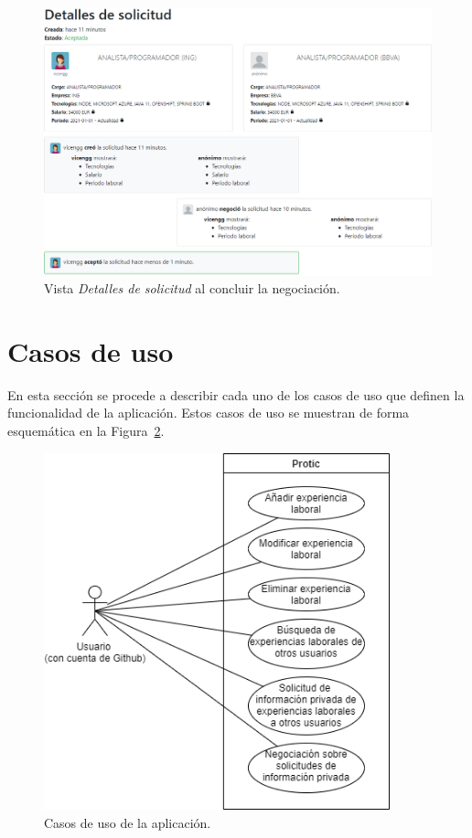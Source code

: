 \documentclass[a4paper, 12pt]{book}
\begin{document}
    \begin{figure}
        \centering
        \includegraphics[width=15cm, keepaspectratio]{img/negotiation_details.PNG}
        \caption{Vista \emph{Detalles de solicitud} al concluir la negociación.}\label{fig:negotiation_details}
    \end{figure}


    \section{Casos de uso}
    \label{sec:use_cases}
    En esta sección se procede a describir cada uno de los casos de uso que definen la funcionalidad de la aplicación.
    Estos casos de uso se muestran de forma esquemática en la Figura~\ref{fig:use_cases}.

    \begin{figure}
        \centering
        \includegraphics[width=10cm, keepaspectratio]{img/Casos_de_uso.png}
        \caption{Casos de uso de la aplicación.}\label{fig:use_cases}
    \end{figure}
\end{document}
